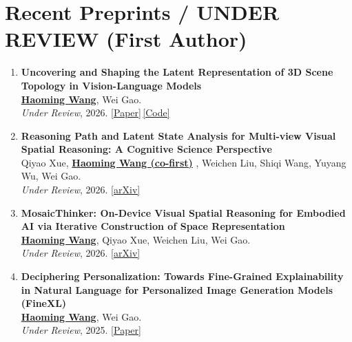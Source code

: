 \documentclass[11pt, letterpaper]{article}
\newenvironment{publistcont}{
  \begin{enumerate}[resume*=pubs]
}{\end{enumerate}}
\newcommand{\impactbullet}[1]{%
  \par\vspace{1pt}%
  \begin{itemize}[leftmargin=1.2em, topsep=0pt, itemsep=0pt, parsep=0pt, partopsep=0pt]
    \item #1
  \end{itemize}}
\newcommand{\me}{\underline{\textbf{Haoming Wang}}}
\newcommand{\meco}{\underline{\textbf{Haoming Wang (co-first)}} }
\begin{document}
\section{Recent Preprints / UNDER REVIEW (First Author)}

\begin{publistcont}

\item\label{pub:vlmlatent} \textbf{Uncovering and Shaping the Latent Representation of 3D Scene Topology in Vision-Language Models}\\
\me, Wei Gao.\\
\textit{Under Review}, 2026. \href{https://haomingwang645.github.io/pdfs/arxiv26_vlm_latent_shaping.pdf}{[Paper]}\,\href{https://github.com/pittisl/vlm-latent-shaping}{[Code]}

\item\label{pub:remindview} \textbf{Reasoning Path and Latent State Analysis for Multi-view Visual Spatial Reasoning: A Cognitive Science Perspective}\\
Qiyao Xue, \meco, Weichen Liu, Shiqi Wang, Yuyang Wu, Wei Gao.\\
\textit{Under Review}, 2026. \href{https://arxiv.org/abs/2512.02340}{[arXiv]}

\item\label{pub:mosaic} \textbf{MosaicThinker: On-Device Visual Spatial Reasoning for Embodied AI via Iterative Construction of Space Representation}\\
\me, Qiyao Xue, Weichen Liu, Wei Gao.\\
\textit{Under Review}, 2026. \href{https://www.arxiv.org/abs/2602.07082}{[arXiv]}

\item\label{pub:finexl} \textbf{Deciphering Personalization: Towards Fine-Grained Explainability in Natural Language for Personalized Image Generation Models (FineXL)}\\
\me, Wei Gao.\\
\textit{Under Review}, 2025. \href{https://haomingwang645.github.io/pdfs/finexl_paper.pdf}{[Paper]}
\end{publistcont}
\end{document}

